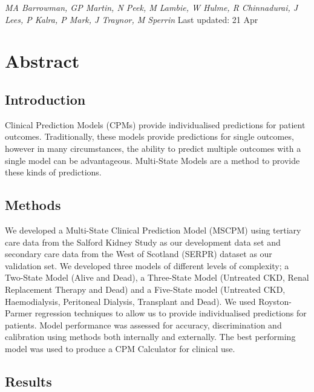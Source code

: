 \documentclass[12pt,PhD,twoside,openright]{muthesis}
\begin{document}
\emph{MA Barrowman, GP Martin, N Peek, M Lambie, W Hulme, R Chinnadurai, J Lees, P Kalra, P Mark, J Traynor, M Sperrin}
Last updated: 21 Apr

\hypertarget{abstract-2}{%
\section*{Abstract}\label{abstract-2}}

\hypertarget{introduction-6}{%
\subsection*{Introduction}\label{introduction-6}}

Clinical Prediction Models (CPMs) provide individualised predictions for patient outcomes. Traditionally, these models provide predictions for single outcomes, however in many circumstances, the ability to predict multiple outcomes with a single model can be advantageous. Multi-State Models are a method to provide these kinds of predictions.

\hypertarget{methods-6}{%
\subsection*{Methods}\label{methods-6}}

We developed a Multi-State Clinical Prediction Model (MSCPM) using tertiary care data from the Salford Kidney Study as our development data set and secondary care data from the West of Scotland (SERPR) dataset as our validation set. We developed three models of different levels of complexity; a Two-State Model (Alive and Dead), a Three-State Model (Untreated CKD, Renal Replacement Therapy and Dead) and a Five-State model (Untreated CKD, Haemodialysis, Peritoneal Dialysis, Transplant and Dead). We used Royston-Parmer regression techniques to allow us to provide individualised predictions for patients. Model performance was assessed for accuracy, discrimination and calibration using methods both internally and externally. The best performing model was used to produce a CPM Calculator for clinical use.

\hypertarget{results-4}{%
\subsection*{Results}\label{results-4}}
\end{document}
